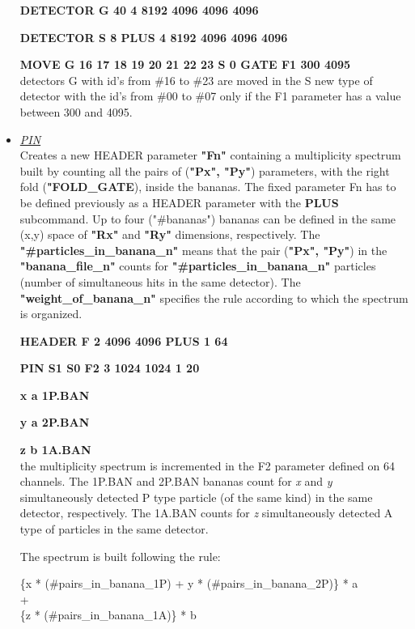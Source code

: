 \begin{itemize}
	\hskip1cm{\bf DETECTOR G 40 4 8192 4096 4096 4096}

	\hskip1cm{\bf DETECTOR S  8 PLUS 4 8192 4096 4096 4096}

	\hskip1cm{\bf MOVE G 16 17 18 19 20 21 22 23 S 0 GATE F1 300 4095} \\
	detectors G with id's from \#16 to \#23 are moved in the S new type of
	detector with the id's from \#00 to \#07 only if the F1 parameter has a
	value between 300 and 4095.

 \item	{\it\underline{PIN}}\\
 
	Creates a new HEADER parameter {\bf "Fn"} containing a multiplicity 
	spectrum built by counting all the pairs of ({\bf "Px", "Py"}) 
	parameters, 
	with the right fold ({\bf "FOLD\_GATE}), inside the bananas. The fixed 
	parameter Fn has to be defined 
	previously as a HEADER parameter with the {\bf PLUS} subcommand.
	Up to four ("\#bananas") 
	bananas can be defined in the same (x,y) space of {\bf "Rx"} and 
	{\bf "Ry"} 
	dimensions, respectively. The {\bf "\#particles\_in\_banana\_n"} means 
	that the pair ({\bf "Px", "Py"}) in the {\bf "banana\_file\_n"} counts 
	for {\bf "\#particles\_in\_banana\_n"} particles (number of
	simultaneous hits in the same detector).
	The {\bf "weight\_of\_banana\_n"} specifies the 
	rule according to which the spectrum is organized. 

	\hskip1cm{\bf HEADER F 2 4096 4096 PLUS 1 64}

	\hskip1cm{\bf PIN S1 S0 F2 3 1024 1024  1 20}

	\hskip2.5cm{\bf  x  a 1P.BAN }

	\hskip2.5cm{\bf  y  a 2P.BAN }

	\hskip2.5cm{\bf  z  b 1A.BAN } \\
	the multiplicity spectrum is incremented in the F2 parameter defined on
	64 channels. The 1P.BAN and 2P.BAN bananas count for {\it x} and 
	{\it y} simultaneously detected P type particle (of the same kind) in 
	the same 
	detector, respectively. The 1A.BAN counts for {\it z} simultaneously
	detected A type of particles in the same detector.

	The spectrum is built following the rule: 

{\bf
\begin{center}
	\{x * (\#pairs\_in\_banana\_1P) + y * (\#pairs\_in\_banana\_2P)\} * a 
	\\ + \\ 
	\{z * (\#pairs\_in\_banana\_1A)\} * b 
\end{center}
}


\end{itemize}
